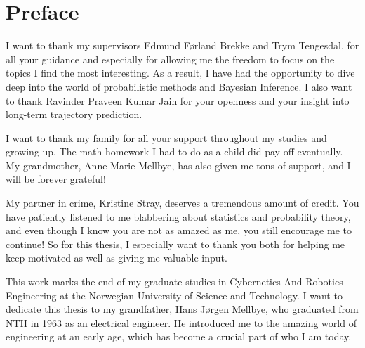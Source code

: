 \chapter*{Preface}

I want to thank my supervisors Edmund Førland Brekke and Trym Tengesdal, for all your guidance and especially for allowing me the freedom to focus on the topics I find the most interesting. As a result, I have had the opportunity to dive deep into the world of probabilistic methods and Bayesian Inference. I also want to thank Ravinder Praveen Kumar Jain for your openness and your insight into long-term trajectory prediction.

I want to thank my family for all your support throughout my studies and growing up. The math homework I had to do as a child did pay off eventually. My grandmother, Anne-Marie Mellbye, has also given me tons of support, and I will be forever grateful!   

My partner in crime, Kristine Stray, deserves a tremendous amount of credit. You have patiently listened to me blabbering about statistics and probability theory, and even though I know you are not as amazed as me, you still encourage me to continue! So for this thesis, I especially want to thank you both for helping me keep motivated as well as giving me valuable input. 


This work marks the end of my graduate studies in Cybernetics And Robotics Engineering at the Norwegian University of Science and Technology. I want to dedicate this thesis to my grandfather, Hans Jørgen Mellbye, who graduated from NTH in 1963 as an electrical engineer. He introduced me to the amazing world of engineering at an early age, which has become a crucial part of who I am today. 

